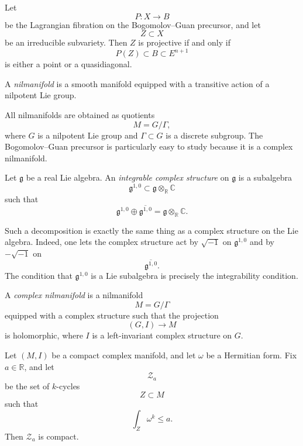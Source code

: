 \begin{theorem}
\label{theorem-let-p}
Let
\[
P:X\to B
\]
be the Lagrangian fibration on the
Bogomolov--Guan precursor, and let
\[
Z\subset X
\]
be an irreducible subvariety.
Then $Z$ is projective if and only if
\[
P(Z)\subset B\subset E^{n+1}
\]
is either a point or a quasidiagonal.
\end{theorem}

\begin{definition}
\label{definition-nilmanifold-smooth2}
A {\it nilmanifold} is a smooth
manifold equipped with a transitive
action of a nilpotent Lie group.
\end{definition}

\begin{remark}
\label{remark-all-nilmanifolds2}
All nilmanifolds are obtained as
quotients
\[
M=G/\Gamma,
\]
where $G$ is a nilpotent Lie group
and $\Gamma\subset G$ is a discrete
subgroup.
The Bogomolov--Guan precursor is
particularly easy to study because it
is a complex nilmanifold.
\end{remark}

\begin{definition}
\label{definition-let-g4}
Let $\mathfrak g$ be a real Lie
algebra.
An {\it integrable complex structure}
on $\mathfrak g$ is a subalgebra
\[
\mathfrak g^{1,0}
\subset
\mathfrak g\otimes_{\mathbb{R}}
\mathbb{C}
\]
such that
\[
\mathfrak g^{1,0}\oplus
\overline{\mathfrak g^{1,0}}
=
\mathfrak g\otimes_{\mathbb{R}}
\mathbb{C}.
\]
\end{definition}

\begin{remark}
\label{remark-such-decomposition2}
Such a decomposition is exactly the
same thing as a complex structure on
the Lie algebra.
Indeed, one lets the complex structure
act by $\sqrt{-1}$ on
$\mathfrak g^{1,0}$ and by
$-\sqrt{-1}$ on
\[
\overline{\mathfrak g^{1,0}}.
\]
The condition that $\mathfrak g^{1,0}$
is a Lie subalgebra is precisely the
integrability condition.
\end{remark}

\begin{definition}
\label{definition-complex2}
A {\it complex nilmanifold} is a
nilmanifold
\[
M=G/\Gamma
\]
equipped with a complex structure such
that the projection
\[
(G,I)\to M
\]
is holomorphic, where $I$ is a
left-invariant complex structure on
$G$.
\end{definition}

\begin{theorem}[Bishop]
\label{theorem-let-m3}
Let $(M,I)$ be a compact complex
manifold, and let $\omega$ be a
Hermitian form.
Fix $a\in\mathbb{R}$, and let
\[
\mathcal Z_a
\]
be the set of $k$-cycles
\[
Z\subset M
\]
such that
\[
\int_Z \omega^k\leq a.
\]
Then $\mathcal Z_a$ is compact.
\end{theorem}

